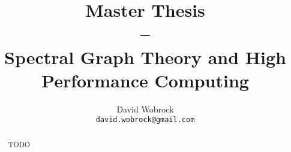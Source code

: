 \documentclass[]{report}
\title{Master Thesis \\ -- \\ Spectral Graph Theory and High Performance Computing}
\author{David Wobrock\\\texttt{david.wobrock@gmail.com}}
\begin{document}
\begin{titlepage}
 \maketitle
\end{titlepage}

\begin{abstract}
 TODO
\end{abstract}

\tableofcontents
\newpage







\clearpage
\printbibliography
\end{document}
